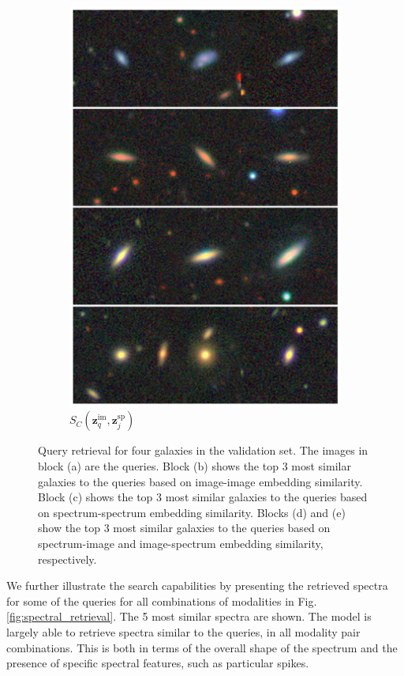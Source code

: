 \documentclass[a4paper,12pt]{article}
\begin{document}
\begin{figure}[H]
\begin{subfigure}{0.22\textwidth}
        \includegraphics[height=0.21\textheight]{../figures/images_sp_im.png}
        \caption{$S_C(\mathbf{z}_q^{\text{im}}, \mathbf{z}_j^{\text{sp}})$}
        \label{fig:retrieval_5}
    \end{subfigure}
    \caption{Query retrieval for four galaxies in the validation set. The images in block (a) are the queries. Block (b) shows the top 3 most similar galaxies to the queries based on image-image embedding similarity. Block (c) shows the top 3 most similar galaxies to the queries based on spectrum-spectrum embedding similarity. Blocks (d) and (e) show the top 3 most similar galaxies to the queries based on spectrum-image and image-spectrum embedding similarity, respectively.}
    \label{fig:retrieval}
\end{figure}
We further illustrate the search capabilities by presenting the retrieved spectra for some of the queries for all combinations of modalities in Fig.\ref{fig:spectral_retrieval}. The 5 most similar spectra are shown. The model is largely able to retrieve spectra similar to the queries, in all modality pair combinations. This is both in terms of the overall shape of the spectrum and the presence of specific spectral features, such as particular spikes. 
\end{document}
